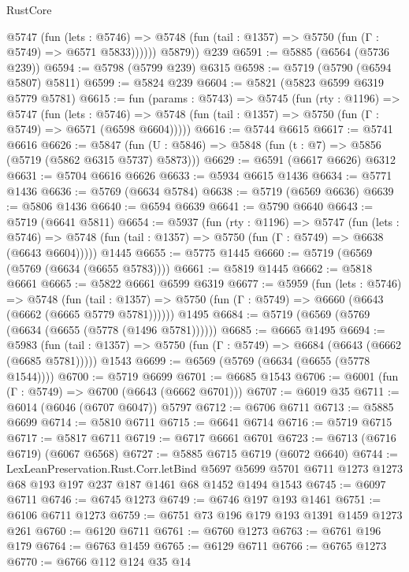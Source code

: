 \begin{lexlean}{RustCore}
\begin{coremodule}
            @5747
              (fun (lets : @5746) =>
              @5748 (fun (tail : @1357) => @5750 (fun (Γ : @5749) => @6571 @5833))))))
        @5879))
    @239
@6591 := @5885 (@6564 (@5736 @239))
@6594 := @5798 (@5799 @239) @6315
@6598 := @5719 (@5790 (@6594 @5807) @5811)
@6599 := @5824 @239
@6604 := @5821 (@5823 @6599 @6319 @5779 @5781)
@6615 := fun (params : @5743) =>
  @5745
    (fun (rty : @1196) =>
    @5747
      (fun (lets : @5746) =>
      @5748 (fun (tail : @1357) => @5750 (fun (Γ : @5749) => @6571 (@6598 @6604)))))
@6616 := @5744 @6615
@6617 := @5741 @6616
@6626 := @5847 (fun (U : @5846) => @5848 (fun (t : @7) => @5856 (@5719 (@5862 @6315 @5737) @5873)))
@6629 := @6591 (@6617 @6626) @6312
@6631 := @5704 @6616 @6626
@6633 := @5934 @6615 @1436
@6634 := @5771 @1436
@6636 := @5769 (@6634 @5784)
@6638 := @5719 (@6569 @6636)
@6639 := @5806 @1436
@6640 := @6594 @6639
@6641 := @5790 @6640
@6643 := @5719 (@6641 @5811)
@6654 := @5937
    (fun (rty : @1196) =>
    @5747
      (fun (lets : @5746) =>
      @5748 (fun (tail : @1357) => @5750 (fun (Γ : @5749) => @6638 (@6643 @6604)))))
    @1445
@6655 := @5775 @1445
@6660 := @5719 (@6569 (@5769 (@6634 (@6655 @5783))))
@6661 := @5819 @1445
@6662 := @5818 @6661
@6665 := @5822 @6661 @6599 @6319
@6677 := @5959
    (fun (lets : @5746) =>
    @5748
      (fun (tail : @1357) => @5750 (fun (Γ : @5749) => @6660 (@6643 (@6662 (@6665 @5779 @5781))))))
    @1495
@6684 := @5719 (@6569 (@5769 (@6634 (@6655 (@5778 (@1496 @5781))))))
@6685 := @6665 @1495
@6694 := @5983
    (fun (tail : @1357) => @5750 (fun (Γ : @5749) => @6684 (@6643 (@6662 (@6685 @5781)))))
    @1543
@6699 := @6569 (@5769 (@6634 (@6655 (@5778 @1544))))
@6700 := @5719 @6699
@6701 := @6685 @1543
@6706 := @6001 (fun (Γ : @5749) => @6700 (@6643 (@6662 @6701)))
@6707 := @6019 @35
@6711 := @6014 (@6046 (@6707 @6047)) @5797
@6712 := @6706 @6711
@6713 := @5885 @6699
@6714 := @5810 @6711
@6715 := @6641 @6714
@6716 := @5719 @6715
@6717 := @5817 @6711
@6719 := @6717 @6661 @6701
@6723 := @6713 (@6716 @6719) (@6067 @6568)
@6727 := @5885 @6715 @6719 (@6072 @6640)
@6744 := LexLeanPreservation.Rust.Corr.letBind
    @5697
    @5699
    @5701
    @6711
    @1273
    @1273
    @68
    @193
    @197
    @237
    @187
    @1461
    @68
    @1452
    @1494
    @1543
@6745 := @6097 @6711
@6746 := @6745 @1273
@6749 := @6746 @197 @193 @1461
@6751 := @6106 @6711 @1273
@6759 := @6751 @73 @196 @179 @193 @1391 @1459 @1273 @261
@6760 := @6120 @6711
@6761 := @6760 @1273
@6763 := @6761 @196 @179
@6764 := @6763 @1459
@6765 := @6129 @6711
@6766 := @6765 @1273
@6770 := @6766 @112 @124 @35 @14

\end{coremodule}
\end{lexlean}
